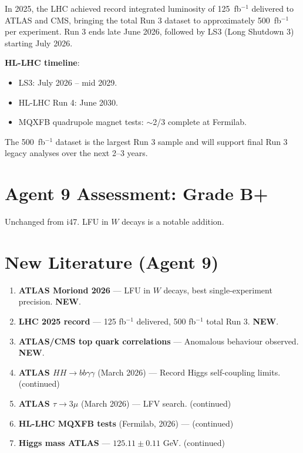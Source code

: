 \documentclass[11pt,a4paper]{article}
\newcommand{\NEW}{\textcolor{dfdblue}{\textbf{NEW}}}
\begin{document}
\begin{tcolorbox}[colback=blue!5!white, colframe=blue!60!black,
  title={\NEW: LHC 2025 Record: 125 fb$^{-1}$ Delivered, 500 fb$^{-1}$ Total}]

In 2025, the LHC achieved record integrated luminosity of 125~fb$^{-1}$ delivered to ATLAS and CMS, bringing the total Run 3 dataset to approximately 500~fb$^{-1}$ per experiment. Run 3 ends late June 2026, followed by LS3 (Long Shutdown 3) starting July 2026.

\textbf{HL-LHC timeline}:
\begin{itemize}
\item LS3: July 2026 -- mid 2029.
\item HL-LHC Run 4: June 2030.
\item MQXFB quadrupole magnet tests: $\sim$2/3 complete at Fermilab.
\end{itemize}

The 500~fb$^{-1}$ dataset is the largest Run 3 sample and will support final Run 3 legacy analyses over the next 2--3 years.
\end{tcolorbox}

\section{Agent 9 Assessment: Grade B+}

Unchanged from i47. LFU in $W$ decays is a notable addition.

\section{New Literature (Agent 9)}

\begin{enumerate}
\item \textbf{ATLAS Moriond 2026} --- LFU in $W$ decays, best single-experiment precision. \NEW.
\item \textbf{LHC 2025 record} --- 125 fb$^{-1}$ delivered, 500 fb$^{-1}$ total Run 3. \NEW.
\item \textbf{ATLAS/CMS top quark correlations} --- Anomalous behaviour observed. \NEW.
\item \textbf{ATLAS $HH \to bb\gamma\gamma$} (March 2026) --- Record Higgs self-coupling limits. (continued)
\item \textbf{ATLAS $\tau \to 3\mu$} (March 2026) --- LFV search. (continued)
\item \textbf{HL-LHC MQXFB tests} (Fermilab, 2026) --- (continued)
\item \textbf{Higgs mass ATLAS} --- $125.11 \pm 0.11$ GeV. (continued)
\end{enumerate}
\end{document}
